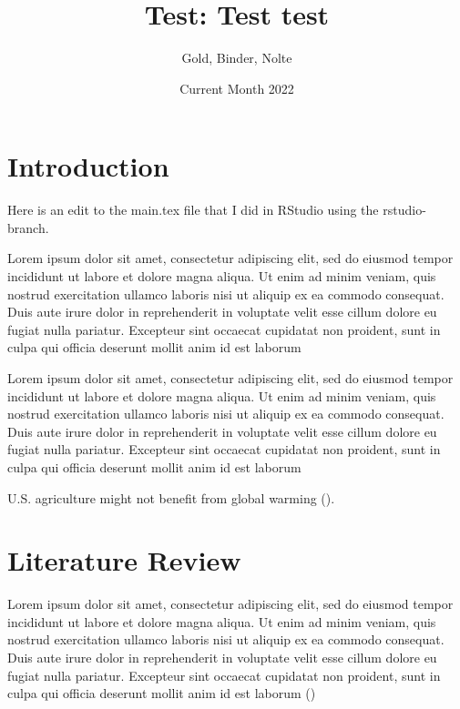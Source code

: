 \documentclass{article}
\title{Test: Test test}
\author{Gold, Binder, Nolte}
\date{Current Month 2022}
\begin{document}
\maketitle

\section{Introduction}


\par Here is an edit to the main.tex file that I did in RStudio using the rstudio-branch. 
\par Lorem ipsum dolor sit amet, consectetur adipiscing elit, sed do eiusmod tempor incididunt ut labore et dolore magna aliqua. Ut enim ad minim veniam, quis nostrud exercitation ullamco laboris nisi ut aliquip ex ea commodo consequat. Duis aute irure dolor in reprehenderit in voluptate velit esse cillum dolore eu fugiat nulla pariatur. Excepteur sint occaecat cupidatat non proident, sunt in culpa qui officia deserunt mollit anim id est laborum 

\par Lorem ipsum dolor sit amet, consectetur adipiscing elit, sed do eiusmod tempor incididunt ut labore et dolore magna aliqua. Ut enim ad minim veniam, quis nostrud exercitation ullamco laboris nisi ut aliquip ex ea commodo consequat. Duis aute irure dolor in reprehenderit in voluptate velit esse cillum dolore eu fugiat nulla pariatur. Excepteur sint occaecat cupidatat non proident, sunt in culpa qui officia deserunt mollit anim id est laborum
\par U.S. agriculture might not benefit from global warming (\cite{Schlenker2005}).

\section{Literature Review}

\par Lorem ipsum dolor sit amet, consectetur adipiscing elit, sed do eiusmod tempor incididunt ut labore et dolore magna aliqua. Ut enim ad minim veniam, quis nostrud exercitation ullamco laboris nisi ut aliquip ex ea commodo consequat. Duis aute irure dolor in reprehenderit in voluptate velit esse cillum dolore eu fugiat nulla pariatur. Excepteur sint occaecat cupidatat non proident, sunt in culpa qui officia deserunt mollit anim id est laborum (\cite{Schlenker2005})

\medskip

\printbibliography
\end{document}
